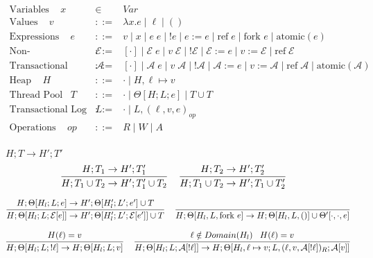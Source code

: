 \documentclass[9pt]{article}
\newcommand{\aeval}[1]{\mathcal{A}[#1]}
\newcommand{\actxt}[0]{\mathcal{A}}
\newcommand{\eval}[1]{\mathcal{E}[#1]}
\newcommand{\ctxt}[0]{\mathcal{E}}
\newcommand{\loc}[0]{\ell}
\newcommand{\atomic}[1]{\text{atomic}(#1)}
\newcommand{\alloc}[1]{\text{ref} \; #1}
\newcommand{\fork}[1]{\text{fork } #1}
\begin{document}
\begingroup\makeatletter{}\check@mathfonts


\begin{displaymath}
\begin{array}{rcll}
\text{Variables } \;\;\; x &\in& Var \\
\text{Values } \;\;\; v &::=& \lambda x. e \; | \; \loc \; | \; () \\
\text{Expressions } \;\;\; e &::=& v \; | \; x \; | \; e \; e \; | \; !e \; | \; e := e \; | \; \alloc{e} \; | \; \fork{e} \; | \; \atomic{e}\\
\text{Non-Transactional Context } \;\;\; \ctxt &::=& [\cdot] \; | \; \ctxt \; e \; | \; v \; \ctxt \; | \; ! \ctxt \; | \; \ctxt := e \; | \; v := \ctxt \; | \; \alloc{\ctxt} \\
\text{Transactional Context } \;\;\; \actxt &::=& [\cdot] \; | \; \actxt \; e \; | \; v \; \actxt \; | \; ! \actxt \; | \; \actxt := e \; | \; v := \actxt \; | \; \alloc{\actxt} \; | \; \atomic{\actxt} \\
\text{Heap } \;\;\; H &::=& \cdot \; | \; H, \loc \mapsto v \\
\text{Thread Pool} \;\;\; T &::=& \cdot \; | \; \Theta[H; L; e] \; | \; T \cup T \\
\text{Transactional Log } \;\;\; L &::=& \cdot \; | \; L, (\loc, v, e)_{op} \\
\text{Operations } \;\;\; op &::=& R \; | \; W \; | \; A \\
\end{array}
\end{displaymath}

$\boxed{H; T \rightarrow H' ;T'}$
\[%
\infer[]{H; T_1 \cup T_2 \rightarrow H'; T_1' \cup T_2}{H; T_1 \rightarrow H'; T_1'} \;\;\;
\infer[]{H; T_1 \cup T_2 \rightarrow H'; T_1 \cup T_2'}{H; T_2 \rightarrow H'; T_2'} \;\;\; 
\]

\[%
\infer[]{H; \Theta[H_l; L; \eval{e}] \rightarrow H'; \Theta[H_l'; L'; \eval{e'}] \cup T}{H; \Theta[H_l; L; e] \rightarrow H'; \Theta[H_l'; L'; e'] \cup T} \;\;\;
\infer[]{H; \Theta[H_l, L, \fork{e}] \rightarrow H; \Theta[H_l, L, ()] \cup \Theta'[\cdot, \cdot, e]}{}
\]

\[%
\infer[]{H; \Theta[H_l; L; !\loc] \rightarrow H; \Theta[H_l; L; v]}{H(\loc) = v} \;\;\;
\infer[]{H; \Theta[H_l; L; \aeval{!\loc}] \rightarrow H; \Theta[H_l, \loc \mapsto v; L, (\loc, v, \aeval{!\loc})_R; \aeval{v}]}{\loc \notin Domain(H_l) \;\;\; H(\loc) = v } 
\]
\end{document}
